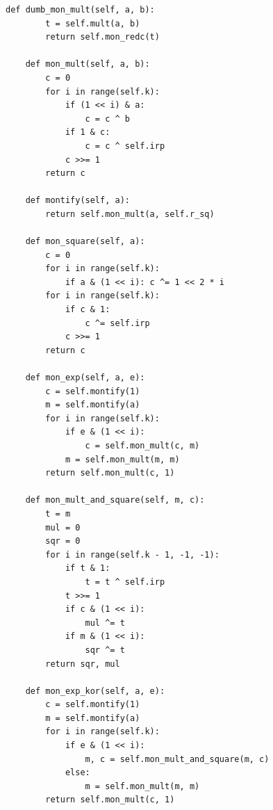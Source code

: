 \documentclass[times,specification,annotation]{itmo-student-thesis}
\begin{document}
\begin{lstlisting}[caption={Реализованная библиотека для вычислений в конечных полях $GF(2^k)$},label={lstX}]
    def dumb_mon_mult(self, a, b):
        t = self.mult(a, b)
        return self.mon_redc(t)

    def mon_mult(self, a, b):
        c = 0
        for i in range(self.k):
            if (1 << i) & a:
                c = c ^ b
            if 1 & c:
                c = c ^ self.irp
            c >>= 1
        return c

    def montify(self, a):
        return self.mon_mult(a, self.r_sq)

    def mon_square(self, a):
        c = 0
        for i in range(self.k):
            if a & (1 << i): c ^= 1 << 2 * i
        for i in range(self.k):
            if c & 1:
                c ^= self.irp
            c >>= 1
        return c

    def mon_exp(self, a, e):
        c = self.montify(1)
        m = self.montify(a)
        for i in range(self.k):
            if e & (1 << i):
                c = self.mon_mult(c, m)
            m = self.mon_mult(m, m)
        return self.mon_mult(c, 1)

    def mon_mult_and_square(self, m, c):
        t = m
        mul = 0
        sqr = 0
        for i in range(self.k - 1, -1, -1):
            if t & 1:
                t = t ^ self.irp
            t >>= 1
            if c & (1 << i):
                mul ^= t
            if m & (1 << i):
                sqr ^= t
        return sqr, mul

    def mon_exp_kor(self, a, e):
        c = self.montify(1)
        m = self.montify(a)
        for i in range(self.k):
            if e & (1 << i):
                m, c = self.mon_mult_and_square(m, c)
            else:
                m = self.mon_mult(m, m)
        return self.mon_mult(c, 1)

\end{lstlisting}
\end{document}
